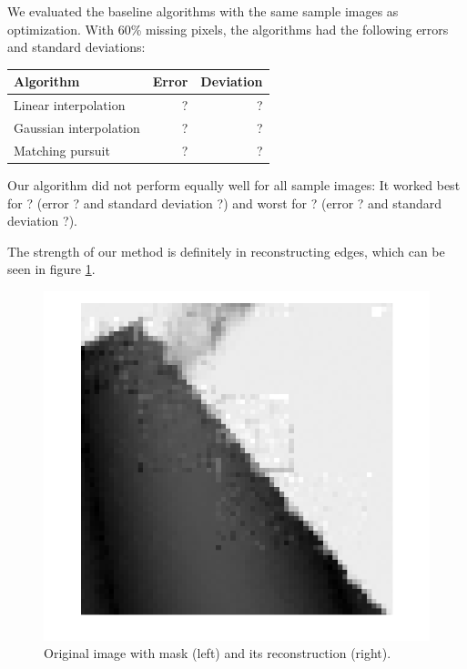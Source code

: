 \documentclass[10pt,conference,compsocconf]{IEEEtran}
\begin{document}
We evaluated the baseline algorithms with the same sample images as optimization. With 60\% missing pixels, the algorithms had the following errors and standard deviations:

\begin{table}[h]
\centering
\begin{tabular}{l|r|r}
Algorithm & Error & Deviation \\
\hline
Linear interpolation & ? & ? \\
Gaussian interpolation & ? & ? \\
Matching pursuit & ? & ? \\
\end{tabular}
\end{table}

Our algorithm did not perform equally well for all sample images: It worked best for ? (error ? and standard deviation ?) and worst for ? (error ? and standard deviation ?).

The strength of our method is definitely in reconstructing edges, which can be seen in figure \ref{edge_reconstruction}.

\begin{figure}
\centering
\includegraphics[width=\columnwidth]{images/framing_artifacts.png}
\caption{Original image with mask (left) and its reconstruction (right).}
\label{edge_reconstruction}
\end{figure}
\end{document}
